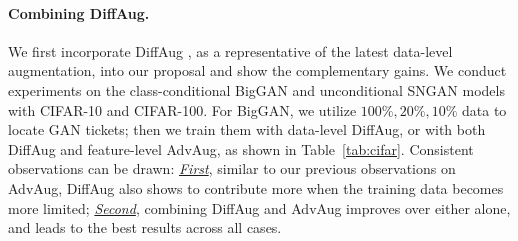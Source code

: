 \documentclass{article}
\begin{document}
\paragraph{Combining DiffAug.} We first incorporate DiffAug \cite{zhao2020diffaugment}, as a representative of the latest data-level augmentation, into our proposal and show the complementary gains. We conduct experiments on the class-conditional BigGAN and unconditional SNGAN models with CIFAR-10 and CIFAR-100. For BigGAN, we utilize $100\%,20\%,10\%$ data to locate GAN tickets; then we train them with data-level DiffAug, or with both DiffAug and feature-level AdvAug, as shown in Table~\ref{tab:cifar}. Consistent observations can be drawn: \underline{\textit{First}}, similar to our previous observations on AdvAug, DiffAug also shows to contribute more when the training data becomes more limited; \underline{\textit{Second}}, combining DiffAug and AdvAug improves over either alone, and leads to the best results across all cases.
\end{document}
